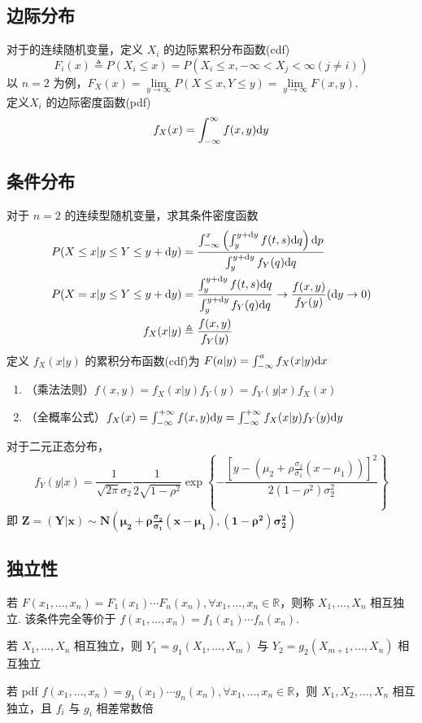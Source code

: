 \documentclass[./main.tex]{subfiles}
\begin{document}
\subsection{边际分布}
对于的连续随机变量，定义 $X_i$ 的边际累积分布函数(cdf)
\begin{equation}
    F_i(x)\triangleq P(X_i\le x)=P(X_i\le x,-\infty<X_j<\infty(j\neq i))
\end{equation}
以 $n=2$ 为例，$F_X(x)=\lim\limits_{y\rightarrow\infty}P(X\le x,Y\le y)=\lim\limits_{y\rightarrow\infty}F(x,y)$. \\
定义$X_i$ 的边际密度函数(pdf)
 $$f_X(x)=\int_{-\infty}^{\infty}f(x,y)\text{d}y$$
\subsection{条件分布}
对于 $n=2$ 的连续型随机变量，求其条件密度函数
\begin{align}
    P(X\le x|y\le Y\le y+\text{d}y)&=\frac{\int_{-\infty}^x\left(\int_y^{y+\text{d}y}f(t,s)\text{d}q\right)\text{d}p}{\int_{y}^{y+\text{d}y}f_Y(q)\text{d}q}\notag\\
    P(X=x|y\le Y\le y+\text{d}y)&=\frac{\int_y^{y+\text{d}y}f(t,s)\text{d}q}{\int_{y}^{y+\text{d}y}f_Y(q)\text{d}q}\notag\rightarrow\frac{f(x,y)}{f_Y(y)}\notag(\text{d}y\rightarrow 0)\\
    f_X(x|y)&\triangleq\frac{f(x,y)}{f_Y(y)}
\end{align}
定义 $f_X(x|y)$ 的累积分布函数(cdf)为 $F(a|y)=\int_{-\infty}^a f_X(x|y)\text{d}x$
\begin{enumerate}[(1)]
    \item （乘法法则）$f(x,y)=f_X(x|y)f_Y(y)=f_Y(y|x)f_X(x)$
    \item （全概率公式）$f_X(x)=\int_{-\infty}^{+\infty}f(x,y)\text{d}y=\int_{-\infty}^{+\infty}f_X(x|y)f_Y(y)\text{d}y$
\end{enumerate}
对于二元正态分布，
\begin{equation}
    f_Y(y|x)=\frac{1}{\sqrt{2\pi}\sigma_2}\frac{1}{2\sqrt{1-\rho^2}}\exp\left\{-\frac{[y-(\mu_2+\rho\frac{\sigma_2}{\sigma_1}(x-\mu_1))]^2}{2(1-\rho^2)\sigma_2^2}\right\}
\end{equation}
即 $\bm{Z=(Y|x)\sim N(\mu_2+\rho\frac{\sigma_2}{\sigma_1}(x-\mu_1),(1-\rho^2)\sigma_2^2)}$
\subsection{独立性}
若 $F(x_1,\dots,x_n)=F_1(x_1)\cdots F_n(x_n),\forall x_1,\dots,x_n\in\mathbb{R}$，则称 $X_1,\dots,X_n$ 相互独立. 该条件完全等价于 $f(x_1,\dots,x_n)=f_1(x_1)\cdots f_n(x_n)$. 
\begin{enumerate*}
    \item 若 $X_1,\dots,X_n$ 相互独立，则 $Y_1=g_1(X_1,\dots,X_m)$ 与 $Y_2=g_2(X_{m+1},\dots,X_n)$ 相互独立
    \item 若 pdf $f(x_1,\dots,x_n)=g_1(x_1)\cdots g_n(x_n),\forall x_1,\dots,x_n\in\mathbb{R}$，则 $X_1,X_2,\dots,X_n$ 相互独立，且 $f_i$ 与 $g_i$ 相差常数倍 
\end{enumerate*}
\end{document}
